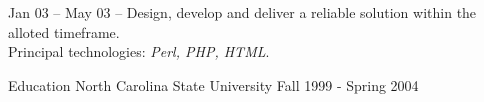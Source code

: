 \documentclass[letterpaper, 11pt]{article}
\begin{document}
\begin{resume}
\begin{block}
\begin{subcategory}{Jan 03 -- May 03}
                -- Design, develop and deliver a reliable solution within the alloted timeframe.
                \\[1ex]
                Principal technologies: \emph{Perl, PHP, HTML}.
                \bigskip
                \bigskip
            \end{subcategory}
        \end{block}
        \begin{block}
            \begin{category}{Education}
                 {North Carolina State University}
                        { }                        {Fall 1999 - Spring 2004}
            \end{category}
        \end{block}
    \end{resume}
\end{document}
